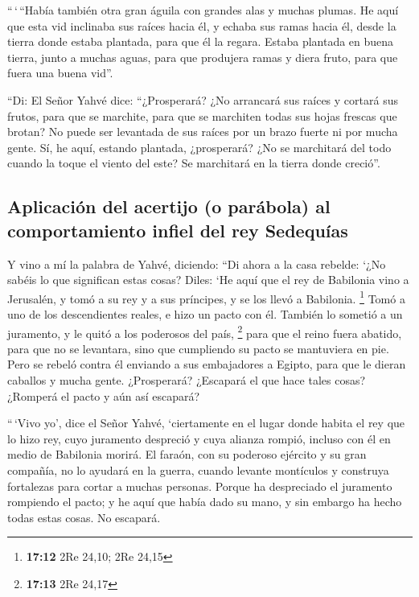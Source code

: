 \begin{paracol}{2}
 ``\,`\,``Había también otra gran águila con grandes alas
y muchas plumas. He aquí que esta vid inclinaba sus raíces hacia él, y
echaba sus ramas hacia él, desde la tierra donde estaba plantada, para
que él la regara.  Estaba plantada en buena tierra, junto
a muchas aguas, para que produjera ramas y diera fruto, para que fuera
una buena vid''.

 ``Di: El Señor Yahvé dice: ``¿Prosperará? ¿No arrancará
sus raíces y cortará sus frutos, para que se marchite, para que se
marchiten todas sus hojas frescas que brotan? No puede ser levantada de
sus raíces por un brazo fuerte ni por mucha gente.  Sí,
he aquí, estando plantada, ¿prosperará? ¿No se marchitará del todo
cuando la toque el viento del este? Se marchitará en la tierra donde
creció''.

\hypertarget{aplicaciuxf3n-del-acertijo-o-paruxe1bola-al-comportamiento-infiel-del-rey-sedequuxedas}{%
\subsection{Aplicación del acertijo (o parábola) al comportamiento
infiel del rey
Sedequías}\label{aplicaciuxf3n-del-acertijo-o-paruxe1bola-al-comportamiento-infiel-del-rey-sedequuxedas}}

 Y vino a mí la palabra de Yahvé, diciendo:
 ``Di ahora a la casa rebelde: `¿No sabéis lo que
significan estas cosas? Diles: `He aquí que el rey de Babilonia vino a
Jerusalén, y tomó a su rey y a sus príncipes, y se los llevó a
Babilonia. \footnote{\textbf{17:12} 2Re 24,10; 2Re 24,15}
 Tomó a uno de los descendientes reales, e hizo un pacto
con él. También lo sometió a un juramento, y le quitó a los poderosos
del país, \footnote{\textbf{17:13} 2Re 24,17}  para que
el reino fuera abatido, para que no se levantara, sino que cumpliendo su
pacto se mantuviera en pie.  Pero se rebeló contra él
enviando a sus embajadores a Egipto, para que le dieran caballos y mucha
gente. ¿Prosperará? ¿Escapará el que hace tales cosas? ¿Romperá el pacto
y aún así escapará?

 ``\,`Vivo yo', dice el Señor Yahvé, `ciertamente en el
lugar donde habita el rey que lo hizo rey, cuyo juramento despreció y
cuya alianza rompió, incluso con él en medio de Babilonia morirá.
 El faraón, con su poderoso ejército y su gran compañía,
no lo ayudará en la guerra, cuando levante montículos y construya
fortalezas para cortar a muchas personas.  Porque ha
despreciado el juramento rompiendo el pacto; y he aquí que había dado su
mano, y sin embargo ha hecho todas estas cosas. No escapará.


\end{paracol}
